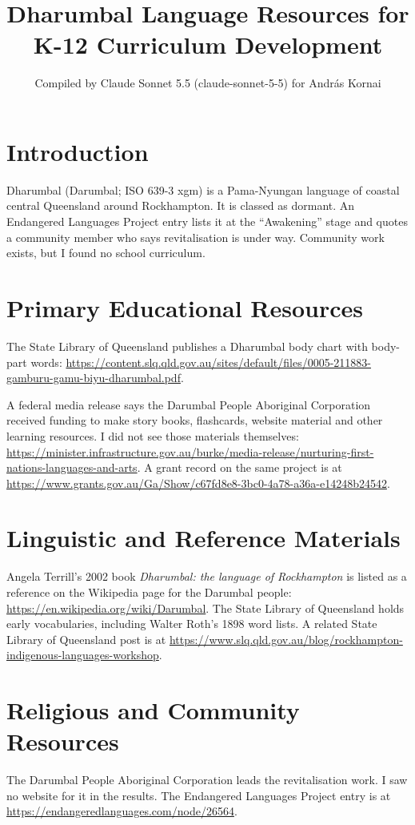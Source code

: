 \documentclass[12pt]{article}
\title{Dharumbal Language Resources for K-12 Curriculum Development}
\author{Compiled by Claude Sonnet 5.5 (claude-sonnet-5-5) for Andr\'as Kornai}
\date{}
\begin{document}
\maketitle

\section{Introduction}
Dharumbal (Darumbal; ISO 639-3 xgm) is a Pama-Nyungan language of coastal central Queensland around Rockhampton. It is classed as dormant. An Endangered Languages Project entry lists it at the ``Awakening'' stage and quotes a community member who says revitalisation is under way. Community work exists, but I found no school curriculum.

\section{Primary Educational Resources}
The State Library of Queensland publishes a Dharumbal body chart with body-part words: \url{https://content.slq.qld.gov.au/sites/default/files/0005-211883-gamburu-gamu-biyu-dharumbal.pdf}.

A federal media release says the Darumbal People Aboriginal Corporation received funding to make story books, flashcards, website material and other learning resources. I did not see those materials themselves: \url{https://minister.infrastructure.gov.au/burke/media-release/nurturing-first-nations-languages-and-arts}. A grant record on the same project is at \url{https://www.grants.gov.au/Ga/Show/c67fd8e8-3bc0-4a78-a36a-e14248b24542}.

\section{Linguistic and Reference Materials}
Angela Terrill's 2002 book \emph{Dharumbal: the language of Rockhampton} is listed as a reference on the Wikipedia page for the Darumbal people: \url{https://en.wikipedia.org/wiki/Darumbal}. The State Library of Queensland holds early vocabularies, including Walter Roth's 1898 word lists. A related State Library of Queensland post is at \url{https://www.slq.qld.gov.au/blog/rockhampton-indigenous-languages-workshop}.

\section{Religious and Community Resources}
The Darumbal People Aboriginal Corporation leads the revitalisation work. I saw no website for it in the results. The Endangered Languages Project entry is at \url{https://endangeredlanguages.com/node/26564}.
\end{document}
